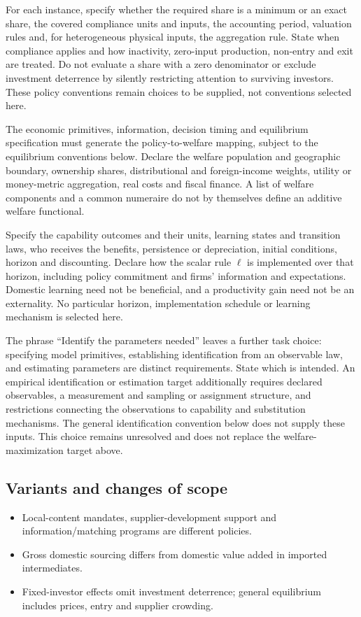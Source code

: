 \documentclass[11pt,a4paper]{article}
\begin{document}
For each instance, specify whether the required share is a minimum or an exact share, the covered compliance units and inputs, the accounting period, valuation rules and, for heterogeneous physical inputs, the aggregation rule. State when compliance applies and how inactivity, zero-input production, non-entry and exit are treated. Do not evaluate a share with a zero denominator or exclude investment deterrence by silently restricting attention to surviving investors. These policy conventions remain choices to be supplied, not conventions selected here.

The economic primitives, information, decision timing and equilibrium specification must generate the policy-to-welfare mapping, subject to the equilibrium conventions below. Declare the welfare population and geographic boundary, ownership shares, distributional and foreign-income weights, utility or money-metric aggregation, real costs and fiscal finance. A list of welfare components and a common numeraire do not by themselves define an additive welfare functional.

Specify the capability outcomes and their units, learning states and transition laws, who receives the benefits, persistence or depreciation, initial conditions, horizon and discounting. Declare how the scalar rule \(\ell\) is implemented over that horizon, including policy commitment and firms' information and expectations. Domestic learning need not be beneficial, and a productivity gain need not be an externality. No particular horizon, implementation schedule or learning mechanism is selected here.

The phrase ``Identify the parameters needed'' leaves a further task choice: specifying model primitives, establishing identification from an observable law, and estimating parameters are distinct requirements. State which is intended. An empirical identification or estimation target additionally requires declared observables, a measurement and sampling or assignment structure, and restrictions connecting the observations to capability and substitution mechanisms. The general identification convention below does not supply these inputs. This choice remains unresolved and does not replace the welfare-maximization target above.

\subsection*{Variants and changes of scope}

\begin{itemize}
\item Local-content mandates, supplier-development support and information/matching programs are different policies.
\item Gross domestic sourcing differs from domestic value added in imported intermediates.
\item Fixed-investor effects omit investment deterrence; general equilibrium includes prices, entry and supplier crowding.
\end{itemize}
\end{document}
